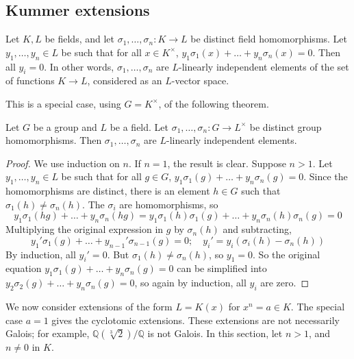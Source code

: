 \subsection{Kummer extensions}
\begin{theorem}
	Let \( K, L \) be fields, and let \( \sigma_1, \dots, \sigma_n \colon K \to L \) be distinct field homomorphisms.
	Let \( y_1, \dots, y_n \in L \) be such that for all \( x \in K^\times \), \( y_1 \sigma_1(x) + \dots + y_n \sigma_n(x) = 0 \).
	Then all \( y_i = 0 \).
	In other words, \( \sigma_1, \dots, \sigma_n \) are \( L \)-linearly independent elements of the set of functions \( K \to L \), considered as an \( L \)-vector space.
\end{theorem}
This is a special case, using \( G = K^\times \), of the following theorem.
\begin{theorem}
	Let \( G \) be a group and \( L \) be a field.
	Let \( \sigma_1, \dots, \sigma_n \colon G \to L^\times \) be distinct group homomorphisms.
	Then \( \sigma_1, \dots, \sigma_n \) are \( L \)-linearly independent elements.
\end{theorem}
\begin{proof}
	We use induction on \( n \).
	If \( n = 1 \), the result is clear.
	Suppose \( n > 1 \).
	Let \( y_1, \dots, y_n \in L \) be such that for all \( g \in G \), \( y_1 \sigma_1(g) + \dots + y_n \sigma_n(g) = 0 \).
	Since the homomorphisms are distinct, there is an element \( h \in G \) such that \( \sigma_1(h) \neq \sigma_n(h) \).
	The \( \sigma_i \) are homomorphisms, so
	\[ y_1 \sigma_1(hg) + \dots + y_n \sigma_n(hg) = y_1 \sigma_1(h)\sigma_1(g) + \dots + y_n \sigma_n(h)\sigma_n(g) = 0 \]
	Multiplying the original expression in \( g \) by \( \sigma_n(h) \) and subtracting,
	\[ y_1' \sigma_1(g) + \dots + y_{n-1}'\sigma_{n-1}(g) = 0;\quad y_i' = y_i(\sigma_i(h) - \sigma_n(h)) \]
	By induction, all \( y_i' = 0 \).
	But \( \sigma_1(h) \neq \sigma_n(h) \), so \( y_1 = 0 \).
	So the original equation \( y_1\sigma_1(g) + \dots + y_n\sigma_n(g) = 0 \) can be simplified into \( y_2\sigma_2(g) + \dots + y_n\sigma_n(g) = 0 \), so again by induction, all \( y_i \) are zero.
\end{proof}
We now consider extensions of the form \( L = K(x) \) for \( x^n = a \in K \).
The special case \( a = 1 \) gives the cyclotomic extensions.
These extensions are not necessarily Galois; for example, \( \mathbb Q(\sqrt[3]{2}) / \mathbb Q \) is not Galois.
In this section, let \( n > 1 \), and \( n \neq 0 \) in \( K \).
